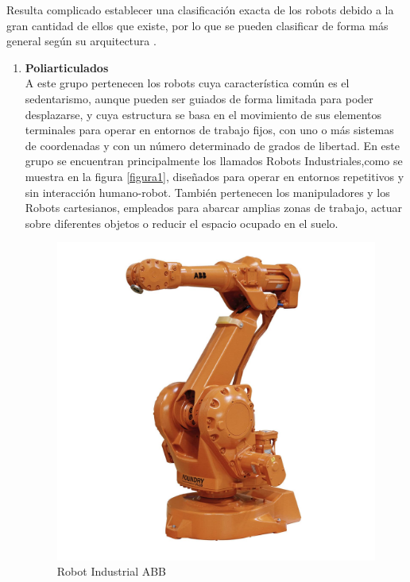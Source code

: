 Resulta complicado establecer una clasificación exacta de los robots debido a la gran cantidad de ellos que existe, por lo que se pueden clasificar de forma más general según su arquitectura \cite{ref6}. 

\begin{enumerate}

\item \textbf{Poliarticulados}\\ A este grupo pertenecen los robots cuya característica común es el sedentarismo, aunque pueden ser guiados de forma limitada para poder desplazarse, y cuya estructura se basa en el movimiento de sus elementos terminales para operar en entornos de trabajo fijos, con uno o más sistemas de coordenadas y con un número determinado de grados de libertad. En este grupo se encuentran principalmente los llamados Robots Industriales,como se muestra en la figura \eqref{figura1}, diseñados para operar en entornos repetitivos y sin interacción humano-robot. También pertenecen los manipuladores y los Robots cartesianos, empleados para abarcar amplias zonas de trabajo, actuar sobre diferentes objetos o reducir el espacio ocupado en el suelo.

\begin{figure}[H]
\centering
\includegraphics[scale=0.12]{imagenes/apartado_2/21_poliarticulado1_Robot_Industrial_ABB}
\caption{Robot Industrial ABB}
\label{figura21}
\end{figure}


\end{enumerate}
